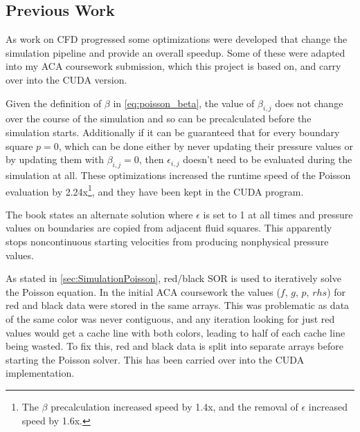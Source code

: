 \subsection{Previous Work}
\label{research:prev_work}
As work on CFD progressed some optimizations were developed that change the simulation pipeline and provide an overall speedup.
Some of these were adapted into my ACA coursework submission\cite{modules:aca257submission}, which this project is based on, and carry over into the CUDA version.


Given the definition of $\beta$ in \cref{eq:poisson_beta}, the value of $\beta_{i,j}$ does not change over the course of the simulation and so can be precalculated before the simulation starts.
Additionally if it can be guaranteed that for every boundary square $p = 0$, which can be done either by never updating their pressure values or by updating them with $\beta_{i,j} = 0$, then $\epsilon_{i,j}$ doesn't need to be evaluated during the simulation at all.
These optimizations increased the runtime speed of the Poisson evaluation by 2.24x\footnote{The $\beta$ precalculation increased speed by 1.4x, and the removal of $\epsilon$ increased speed by 1.6x.\cite{modules:aca257submission}}, and they have been kept in the CUDA program.

The book states an alternate solution where $\epsilon$ is set to 1 at all times and pressure values on boundaries are copied from adjacent fluid squares\cite{book:griebel1998numerical}.
This apparently stops noncontinuous starting velocities from producing nonphysical pressure values.
\label{ext:PressureValues}


As stated in \cref{sec:SimulationPoisson}, red/black SOR is used to iteratively solve the Poisson equation.
In the initial ACA coursework the values ($f$, $g$, $p$, $rhs$) for red and black data were stored in the same arrays.
This was problematic as data of the same color was never contiguous, and any iteration looking for just red values would get a cache line with both colors, leading to half of each cache line being wasted.
To fix this, red and black data is split into separate arrays before starting the Poisson solver.
This has been carried over into the CUDA implementation.

